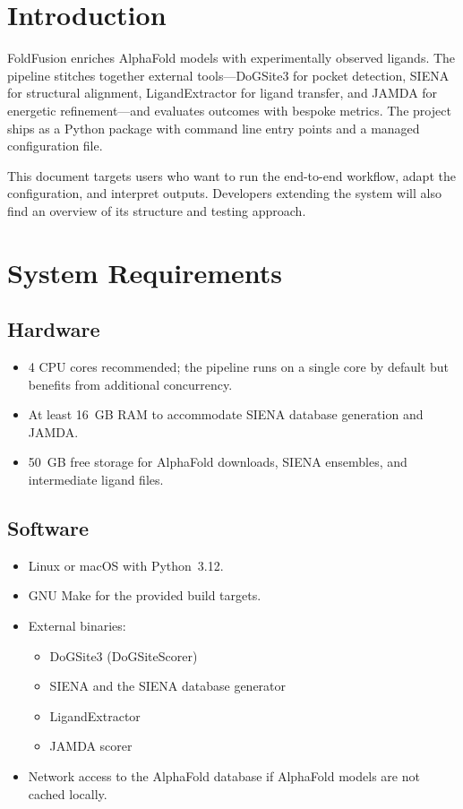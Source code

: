 \documentclass[11pt]{article}
\begin{document}
\section{Introduction}
FoldFusion enriches AlphaFold models with experimentally observed ligands. The
pipeline stitches together external tools---DoGSite3 for pocket detection,
SIENA for structural alignment, LigandExtractor for ligand transfer, and JAMDA
for energetic refinement---and evaluates outcomes with bespoke metrics. The
project ships as a Python package with command line entry points and a managed
configuration file.

This document targets users who want to run the end-to-end workflow, adapt the
configuration, and interpret outputs. Developers extending the system will also
find an overview of its structure and testing approach.

\section{System Requirements}
\subsection{Hardware}
\begin{itemize}[noitemsep]
      \item 4 CPU cores recommended; the pipeline runs on a single core by default
            but benefits from additional concurrency.
      \item At least 16~GB RAM to accommodate SIENA database generation and JAMDA.
      \item 50~GB free storage for AlphaFold downloads, SIENA ensembles, and
            intermediate ligand files.
\end{itemize}

\subsection{Software}
\begin{itemize}[noitemsep]
      \item Linux or macOS with Python~3.12.
      \item GNU Make for the provided build targets.
      \item External binaries:
            \begin{itemize}[noitemsep]
                  \item DoGSite3 (DoGSiteScorer)
                  \item SIENA and the SIENA database generator
                  \item LigandExtractor
                  \item JAMDA scorer
            \end{itemize}
      \item Network access to the AlphaFold database if AlphaFold models are not
            cached locally.
\end{itemize}
\end{document}
